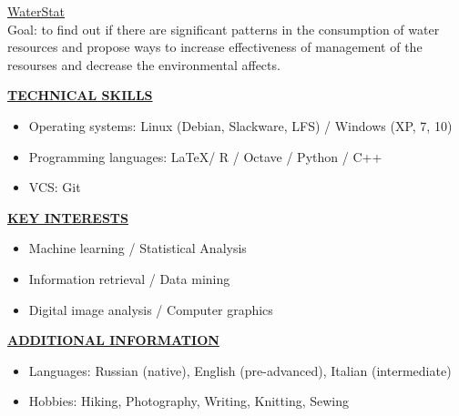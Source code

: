 \documentclass[a4paper,10pt,fullpage]{article}
\begin{document}
\underline{WaterStat}\\
Goal: to find out if there are significant patterns in the consumption of water 
resources and propose ways to increase effectiveness of management of the 
resourses and decrease the environmental affects.\\
\begin{center}
	\underline{\textbf{TECHNICAL SKILLS}}
\end{center}
\begin{itemize}
	\item Operating systems: Linux (Debian, Slackware, LFS) / Windows (XP, 7, 10)
	\item Programming languages: \LaTeX / R / Octave / Python / C++ 
	\item VCS: Git
\end{itemize}

\begin{center}
	\underline{\textbf{KEY INTERESTS}}
\end{center}
\begin{itemize}
	\item Machine learning / Statistical Analysis
	\item Information retrieval / Data mining
	\item Digital image analysis / Computer graphics
\end{itemize}

\begin{center}
	\underline{\textbf{ADDITIONAL INFORMATION}}
\end{center}

\begin{itemize}
	\item Languages: Russian (native), English (pre-advanced), Italian (intermediate)
	\item Hobbies: Hiking, Photography, Writing, Knitting, Sewing
\end{itemize}

\end{document}
